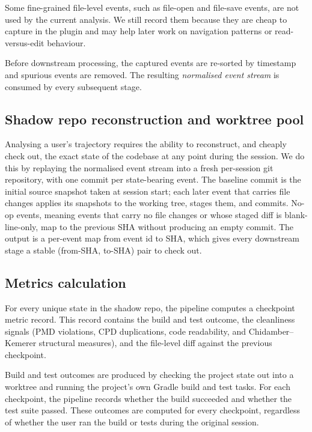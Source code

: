 Some fine-grained file-level events, such as file-open and file-save events, are not used by the current analysis. We still record them because they are cheap to capture in the plugin and may help later work on navigation patterns or read-versus-edit behaviour.

Before downstream processing, the captured events are re-sorted by timestamp and spurious events are removed. The resulting \emph{normalised event stream} is consumed by every subsequent stage.

\subsection{Shadow repo reconstruction and worktree pool}
\label{sec:arch-shadow}

Analysing a user's trajectory requires the ability to reconstruct, and cheaply check out, the exact state of the codebase at any point during the session. We do this by replaying the normalised event stream into a fresh per-session git repository, with one commit per state-bearing event. The baseline commit is the initial source snapshot taken at session start; each later event that carries file changes applies its snapshots to the working tree, stages them, and commits. No-op events, meaning events that carry no file changes or whose staged diff is blank-line-only, map to the previous SHA without producing an empty commit. The output is a per-event map from event id to SHA, which gives every downstream stage a stable (from-SHA, to-SHA) pair to check out.

\subsection{Metrics calculation}
\label{sec:arch-metrics}

For every unique state in the shadow repo, the pipeline computes a checkpoint metric record. This record contains the build and test outcome, the cleanliness signals (PMD violations, CPD duplications, code readability, and Chidamber--Kemerer structural measures), and the file-level diff against the previous checkpoint.

Build and test outcomes are produced by checking the project state out into a worktree and running the project's own Gradle build and test tasks. For each checkpoint, the pipeline records whether the build succeeded and whether the test suite passed. These outcomes are computed for every checkpoint, regardless of whether the user ran the build or tests during the original session.

